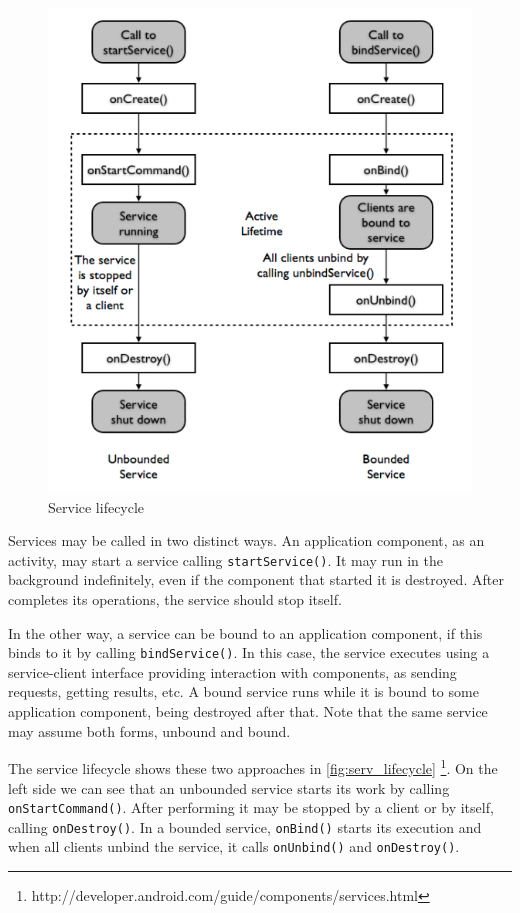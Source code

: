 \begin{figure}[h]
 \begin{center}
 \includegraphics[scale=0.5]{figures/service_lifecycle.png}
 \end{center}
 \caption{Service lifecycle}
 \label{fig:serv_lifecycle}
\end{figure}

Services may be called in two distinct ways. An application component, as an activity, may start a service calling \texttt{startService()}. It may run in the background  indefinitely, even if the component that started it is destroyed. After completes its operations, the service should stop itself.

In the other way, a service can be bound to an application component, if this binds to it by calling \texttt{bindService()}. In this case, the service executes using a service-client interface providing interaction with components, as sending requests, getting results, etc. A bound service runs while it is bound to some application component, being destroyed after that. Note that the same service may assume both forms, unbound and bound.

The service lifecycle shows these two approaches in \autoref{fig:serv_lifecycle} \footnote{http://developer.android.com/guide/components/services.html}. On the left side we can see that an unbounded service starts its work by calling \texttt{onStartCommand()}. After performing it may be stopped by a client or by itself, calling \texttt{onDestroy()}. In a bounded service, \texttt{onBind()} starts its execution and when all clients unbind the service, it calls \texttt{onUnbind()} and \texttt{onDestroy()}.


